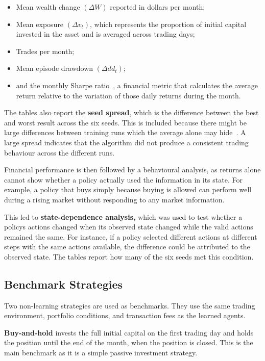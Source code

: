 \begin{itemize}
\item
  Mean wealth change \((\Delta W)\) reported in dollars per month;
\item
  Mean exposure \((\Delta v_{t})\), which represents the proportion of
  initial capital invested in the asset and is averaged across trading
  days;
\item
  Trades per month;
\item
  Mean episode drawdown \((\Delta{dd}_{t})\);
\item
  and the monthly Sharpe ratio~\cite{sharpe1994}, a financial metric that calculates the
  average return relative to the variation of those daily returns during
  the month.
\end{itemize}

The tables also report the \textbf{seed spread}, which is the difference
between the best and worst result across the six seeds. This is included
because there might be large differences between training runs which the
average alone may hide~\cite{henderson2018}. A large spread indicates that the algorithm did
not produce a consistent trading behaviour across the different runs.

Financial performance is then followed by a behavioural analysis, as
returns alone cannot show whether a policy actually used the information
in its state. For example, a policy that buys simply because buying is
allowed can perform well during a rising market without responding to
any market information.

This led to \textbf{state-dependence analysis,} which was used to test
whether a policy\textquotesingle s actions changed when its observed
state changed while the valid actions remained the same. For instance,
if a policy selected different actions at different steps with the same
actions available, the difference could be attributed to the observed
state. The tables report how many of the six seeds met this condition.

\subsection{Benchmark Strategies}

Two non-learning strategies are used as benchmarks. They use the same
trading environment, portfolio conditions, and transaction fees as the
learned agents.

\textbf{Buy-and-hold} invests the full initial capital on the first
trading day and holds the position until the end of the month, when the
position is closed. This is the main benchmark as it is a simple passive
investment strategy.

